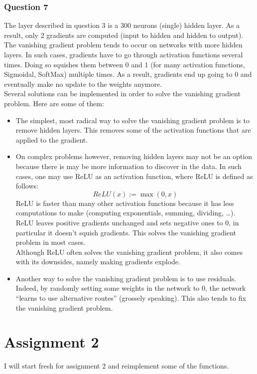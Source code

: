 \documentclass[12pt]{article}
\begin{document}
\subsubsection{Question 7}
The layer described in question 3 is a 300 neurons (single) hidden layer. As a result, only 2 gradients are computed (input to hidden and hidden to output). The vanishing gradient problem tends to occur on networks with more hidden layers. In such cases, gradients have to go through activation functions several times. Doing so squishes them between 0 and 1 (for many activation functions, \eg Sigmoidal, SoftMax) multiple times. As a result, gradients end up going to 0 and eventually make no update to the weights anymore. \\
Several solutions can be implemented in order to solve the vanishing gradient problem. Here are some of them:
\begin{itemize}
  \item The simplest, most radical way to solve the vanishing gradient problem is to remove hidden layers. This removes some of the activation functions that are applied to the gradient.
  \item On complex problems however, removing hidden layers may not be an option because there is may be more information to discover in the data. In such cases, one may use ReLU as an activation function, where ReLU is defined as follows:
        $$
          ReLU(x) := \max (0, x)
        $$
        ReLU is faster than many other activation functions because it has less computations to make (computing exponentials, summing, dividing, \ldots). ReLU leaves positive gradients unchanged and sets negative ones to 0, in particular it doesn't squish gradients. This solves the vanishing gradient problem in most cases. \\
        Although ReLU often solves the vanishing gradient problem, it also comes with its downsides, namely making gradients explode.
  \item Another way to solve the vanishing gradient problem is to use residuals. Indeed, by randomly setting some weights in the network to 0, the network ``learns to use alternative routes'' (grossely speaking). This also tends to fix the vanishing gradient problem.
\end{itemize}



\section{Assignment 2}
I will start fresh for assignment 2 and reimplement some of the functions.
\end{document}

